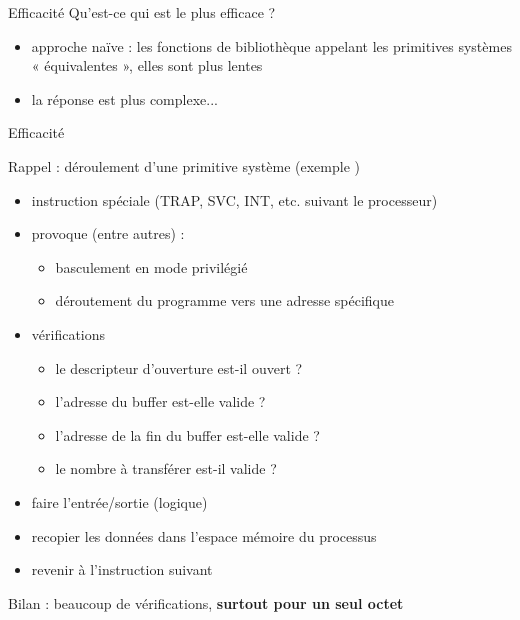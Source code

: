 \begin {frame} {Efficacité}
    Qu'est-ce qui est le plus efficace ?

    \begin {itemize}
	\item approche naïve : les fonctions de bibliothèque appelant
	    les primitives systèmes « équivalentes », elles sont plus
	    lentes
	\item la réponse est plus complexe...
    \end {itemize}
\end {frame}

\begin {frame} {Efficacité}

    Rappel : déroulement d'une primitive système (exemple )

    \begin {itemize}
	\item instruction spéciale (TRAP, SVC, INT, etc. suivant le
	    processeur)
	\item provoque (entre autres) :
	    \begin {itemize}
		\item basculement en mode privilégié
		\item déroutement du programme vers une adresse spécifique
	    \end {itemize}
	\item vérifications
	    \begin {itemize}
		\item le descripteur d'ouverture est-il ouvert ?
		\item l'adresse du buffer est-elle valide ?
		\item l'adresse de la fin du buffer est-elle valide ?
		\item le nombre à transférer est-il valide ?
	    \end {itemize}
	\item faire l'entrée/sortie (logique)
	\item recopier les données dans l'espace mémoire du processus
	\item revenir à l'instruction suivant 
    \end {itemize}
    Bilan : beaucoup de vérifications, \textbf {surtout pour un seul octet}
\end {frame}


